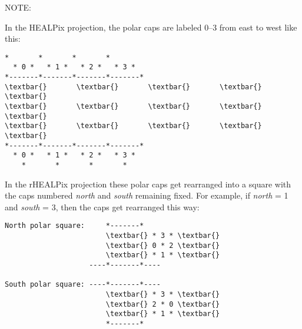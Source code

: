 \documentclass[a4paper,12ptopenany,oneside]{sphinxmanual}
\begin{document}
\begin{fulllineitems}
NOTE:

In the HEALPix projection, the polar caps are labeled 0--3 from 
east to west like this:

\begin{Verbatim}[commandchars=\\\{\}]
    *       *       *       *       
  * 0 *   * 1 *   * 2 *   * 3 *        
*-------*-------*-------*-------*
\textbar{}       \textbar{}       \textbar{}       \textbar{}       \textbar{}
\textbar{}       \textbar{}       \textbar{}       \textbar{}       \textbar{}
\textbar{}       \textbar{}       \textbar{}       \textbar{}       \textbar{}
*-------*-------*-------*-------*
  * 0 *   * 1 *   * 2 *   * 3 *
    *       *       *       *
\end{Verbatim}

In the rHEALPix projection these polar caps get rearranged
into a square with the caps numbered \emph{north} and \emph{south} remaining fixed.
For example, if \emph{north} = 1 and \emph{south} = 3, then the caps get
rearranged this way:

\begin{Verbatim}[commandchars=\\\{\}]
North polar square:     *-------*       
                        \textbar{} * 3 * \textbar{}    
                        \textbar{} 0 * 2 \textbar{}    
                        \textbar{} * 1 * \textbar{}    
                    ----*-------*----
                    
South polar square: ----*-------*----
                        \textbar{} * 3 * \textbar{}
                        \textbar{} 2 * 0 \textbar{}
                        \textbar{} * 1 * \textbar{}
                        *-------*
\end{Verbatim}

\end{fulllineitems}

\end{document}
